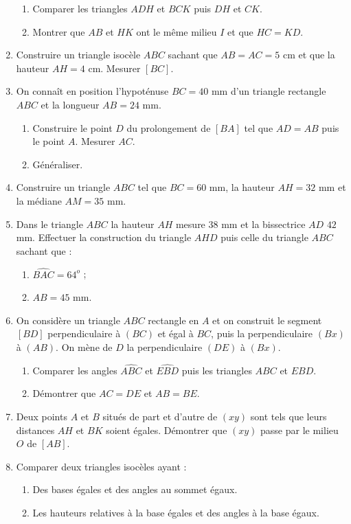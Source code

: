 \begin{enumerate}
\begin{enumerate}
\item Comparer les triangles $ADH$ et $BCK$ puis $DH$ et $CK$. 
\item Montrer que $AB$ et $HK$ ont le même milieu $I$ et que $HC=KD$.
\end{enumerate}
\item Construire un triangle isocèle $ABC$ sachant que $AB=AC=5$ cm et que la hauteur $AH=4$ cm. Mesurer $[BC]$.
\item On connaît en position l'hypoténuse $BC = 40$ mm d'un triangle rectangle $ABC$ et la longueur $AB=24$ mm. \begin{enumerate}
\item Construire le point $D$ du prolongement de $[BA]$ tel que $AD=AB$ puis le point 
$A$. Mesurer $AC$. 
\item Généraliser.
\end{enumerate}
\item Construire un triangle $ABC$ tel que $BC=60$ mm, la hauteur $AH=32$ mm et la médiane $AM=35$ mm. 
\item Dans le triangle $ABC$ la hauteur $AH$ mesure $38$ mm et la bissectrice $AD$ $42$ mm. Effectuer la construction du triangle $AHD$ puis celle du triangle $ABC$ sachant que :\begin{enumerate}
\item $\widehat{BAC}=64^o$ ; 
\item $AB=45$ mm.
\end{enumerate}
\item On considère un triangle $ABC$ rectangle en $A$ et on construit le segment $[BD]$ perpendiculaire à $(BC)$ et égal à $BC$, puis la perpendiculaire $(Bx)$ à
$(AB)$. On mène de $D$ la perpendiculaire $(DE)$ à $(Bx)$.\begin{enumerate}
\item Comparer les angles $\widehat{ABC}$ et $\widehat{EBD}$ puis les triangles
$ABC$ et $EBD$.
\item Démontrer que $AC=DE$ et $AB=BE$.
\end{enumerate}
\item Deux points $A$ et $B$ situés de part et d'autre de $(xy)$ sont tels que leurs distances $AH$ et $BK$ soient égales. Démontrer que $(xy)$ passe par le milieu $O$ 
de $[AB]$.
\item Comparer deux triangles isocèles ayant : \begin{enumerate}
\item Des bases égales et des angles au sommet égaux.
\item Les hauteurs relatives à la base égales et des angles à la base égaux.

\end{enumerate}
\end{enumerate}
